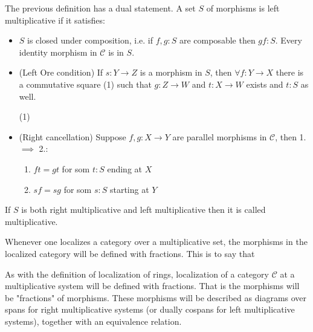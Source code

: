     \begin{remark}
        The previous definition has a dual statement. A set $S$ of morphisms is left multiplicative if it satisfies:
        \begin{itemize}
            \item $S$ is closed under composition, i.e. if $f,g : S$ are composable then $gf : S$. Every identity morphism in $\mathcal{C}$ is in $S$.
            \item (Left Ore condition) If $s : Y \rightarrow Z$ is a morphism in $S$, then $\forall f:Y\rightarrow X$ there is a commutative square (1) such that $g:Z\rightarrow W$ and $t:X\rightarrow W$ exists and $t:S$ as well.
            \begin{center}
                (1)
            \end{center}
            \item (Right cancellation) Suppose $f,g:X\rightarrow Y$ are parallel morphisms in $\mathcal{C}$, then 1. $\implies$ 2.:
            \begin{enumerate}
                \item $ft = gt$ for som $t:S$ ending at $X$
                \item $sf = sg$ for som $s:S$ starting at $Y$
            \end{enumerate}
        \end{itemize}
        If $S$ is both right multiplicative and left multiplicative then it is called multiplicative.
    \end{remark}


    Whenever one localizes a category over a multiplicative set, the morphisms in the localized category will be defined with fractions. This is to say that 

    As with the definition of localization of rings, localization of a category $\mathcal{C}$ at a multiplicative system will be defined with fractions. That is the morphisms will be "fractions" of morphisms. These morphisms will be described as diagrams over spans for right multiplicative systems (or dually cospans for left multiplicative systems), together with an equivalence relation.

